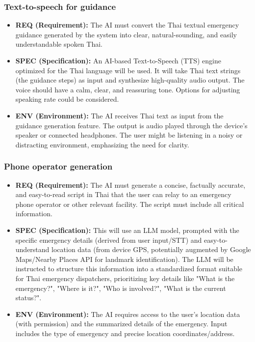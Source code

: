 \subsubsection{Text-to-speech for guidance}
\label{ssubsec:req_tts_guidance}
\begin{itemize}
    \item \textbf{REQ (Requirement):} The AI must convert the Thai textual emergency guidance generated by the system into clear, natural-sounding, and easily understandable spoken Thai.
    \item \textbf{SPEC (Specification):} An AI-based Text-to-Speech (TTS) engine optimized for the Thai language will be used. It will take Thai text strings (the guidance steps) as input and synthesize high-quality audio output. The voice should have a calm, clear, and reassuring tone. Options for adjusting speaking rate could be considered.
    \item \textbf{ENV (Environment):} The AI receives Thai text as input from the guidance generation feature. The output is audio played through the device's speaker or connected headphones. The user might be listening in a noisy or distracting environment, emphasizing the need for clarity.
\end{itemize}

\subsubsection{Phone operator generation}
\label{ssubsec:req_phone_operator}
\begin{itemize}
    \item \textbf{REQ (Requirement):} The AI must generate a concise, factually accurate, and easy-to-read script in Thai that the user can relay to an emergency phone operator or other relevant facility. The script must include all critical information.
    \item \textbf{SPEC (Specification):} This will use an LLM model, prompted with the specific emergency details (derived from user input/STT) and easy-to-understand location data (from device GPS, potentially augmented by Google Maps/Nearby Places API for landmark identification). The LLM will be instructed to structure this information into a standardized format suitable for Thai emergency dispatchers, prioritizing key details like "What is the emergency?", "Where is it?", "Who is involved?", "What is the current status?".
    \item \textbf{ENV (Environment):} The AI requires access to the user's location data (with permission) and the summarized details of the emergency. Input includes the type of emergency and precise location coordinates/address.
\end{itemize}

